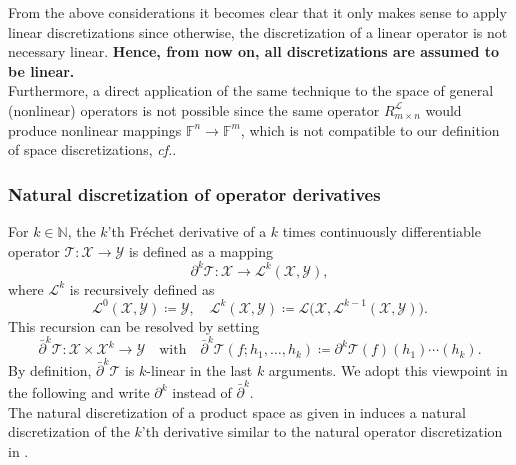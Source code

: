 \documentclass[a4paper]{paper}
\newcommand*{\SPC}[1]{{\ensuremath{\mathscr{#1}}}}
\newcommand*{\SPCL}{\SPC{L}}
\newcommand*{\SPCX}{\SPC{X}}
\newcommand*{\SPCY}{\SPC{Y}}
\newcommand{\FIELD}{{\ensuremath{\mathbb{F}}}}
\newcommand*{\Fn}{{\ensuremath{\FIELD^n}}}
\newcommand*{\Fm}{{\ensuremath{\FIELD^m}}}
\newcommand{\Natural}{\mathbb{N}}
\newcommand*{\OP}[1]{{\ensuremath{\mathcal{#1}}}}
\newcommand*{\OPT}{\OP{T}}
\newcommand*{\REST}[2]{\ensuremath{R_{#1}^{#2}}}
\newcommand{\cf}{\textsl{cf.}\xspace}
\begin{document}
\begin{remark}
 From the above considerations it becomes clear that it only makes sense to apply linear discretizations since 
 otherwise, the discretization of a linear operator is not necessary linear. \textbf{Hence, from now on, all 
 discretizations are assumed to be linear.}\\
 Furthermore, a direct application of the same technique to the space of general (nonlinear) operators is not possible 
 since the same operator $\REST{m\times n}{\SPCL}$ would produce nonlinear mappings $\Fn \to \Fm$, which is 
 not compatible to our definition of space discretizations, \cf {}.
\end{remark}


\subsubsection{Natural discretization of operator derivatives}
\label{subsubsec:discr:operator:op_deriv}

For $k \in \Natural$, the $k$'th Fr\'{e}chet derivative of a $k$ times continuously differentiable operator 
$\OPT \colon \SPCX \to \SPCY$ is defined as a mapping
%
\begin{equation*}
 \partial^k \OPT \colon \SPCX \to \SPCL^k(\SPCX, \SPCY),
\end{equation*}
%
where $\SPCL^k$ is recursively defined as 
%
\begin{equation*}
 \SPCL^0(\SPCX, \SPCY) \coloneqq  \SPCY, \quad 
 \SPCL^k(\SPCX, \SPCY) \coloneqq  \SPCL\big( \SPCX, \SPCL^{k-1}(\SPCX, \SPCY) \big).
\end{equation*}
%
This recursion can be resolved by setting
%
\begin{equation*}
 \bar\partial^k \OPT \colon \SPCX \times \SPCX^k \to \SPCY
 \quad \text{with} \quad
 \bar\partial^k \OPT(f; h_1, \dotsc, h_k) \coloneqq  \partial^k\OPT(f)(h_1)\cdots(h_k).
\end{equation*}
%
By definition, $\bar\partial^k\OPT$ is $k$-linear in the last $k$ arguments. We adopt this viewpoint in the following 
and write $\partial^k$ instead of $\bar\partial^k$.\\
%
The natural discretization of a product space as given in  induces a 
natural discretization of the $k$'th derivative similar to the natural operator discretization in 
.
\end{document}
